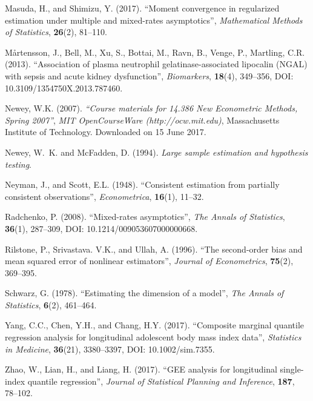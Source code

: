 \documentclass[12pt]{article}
\begin{document}
\begin{thebibliography}{7}
Masuda, H., and Shimizu, Y. (2017).
\newblock ``Moment convergence in regularized estimation under multiple and mixed-rates asymptotics'',
\newblock \textit{Mathematical Methods of Statistics}, \textbf{26}(2), 81--110.


M\r{a}rtensson, J., Bell, M., Xu, S.,  Bottai, M., Ravn, B., Venge, P., Martling, C.R. (2013).
\newblock ``Association of plasma neutrophil gelatinase-associated lipocalin (NGAL) with sepsis and acute kidney dysfunction'',
\newblock \textit{Biomarkers}, \textbf{18}(4), 349--356, DOI: 10.3109/1354750X.2013.787460.

Newey, W.K. (2007).
\newblock \textit{``Course materials for 14.386 New Econometric Methods, Spring 2007''},
\newblock \textit{MIT OpenCourseWare (http://ocw.mit.edu)}, Massachusetts Institute of Technology.
Downloaded on 15 June 2017.



Newey, W.~K. and McFadden, D. (1994).
\textit{Large sample estimation and hypothesis testing}.

Neyman, J., and Scott, E.L. (1948).
\newblock ``Consistent estimation from partially consistent observations'',
\newblock \textit{Econometrica}, \textbf{16}(1), 11--32.


Radchenko, P. (2008).
\newblock ``Mixed-rates asymptotics'',
\newblock \textit{The Annals of Statistics}, \textbf{36}(1), 287--309,
DOI: 10.1214/009053607000000668.

Rilstone, P., Srivastava. V.K., and Ullah, A. (1996).
\newblock ``The second-order bias and mean squared error of nonlinear estimators'',
\newblock \textit{Journal of Econometrics}, \textbf{75}(2), 369--395.


Schwarz, G. (1978).
\newblock ``Estimating the dimension of a model'',
\newblock \textit{The Annals of Statistics}, \textbf{6}(2), 461--464.



Yang, C.C., Chen, Y.H., and Chang, H.Y. (2017).
\newblock ``Composite marginal quantile regression analysis for longitudinal adolescent body mass index data'',
\newblock \textit{Statistics in Medicine}, \textbf{36}(21), 3380--3397,
DOI: 10.1002/sim.7355.


Zhao, W., Lian, H., and Liang, H. (2017).
\newblock ``GEE analysis for longitudinal single-index quantile regression'',
\newblock \textit{Journal of Statistical Planning and Inference}, \textbf{187}, 78--102.




\end{thebibliography}
\end{document}
